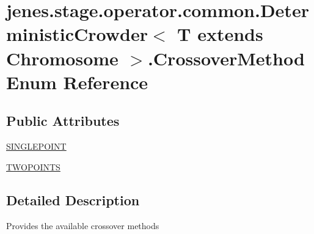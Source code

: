 \hypertarget{enumjenes_1_1stage_1_1operator_1_1common_1_1_deterministic_crowder_3_01_t_01extends_01_chromosome_01_4_1_1_crossover_method}{\section{jenes.\-stage.\-operator.\-common.\-Deterministic\-Crowder$<$ T extends Chromosome $>$.Crossover\-Method Enum Reference}
\label{enumjenes_1_1stage_1_1operator_1_1common_1_1_deterministic_crowder_3_01_t_01extends_01_chromosome_01_4_1_1_crossover_method}
}
\subsection*{Public Attributes}
\begin{DoxyCompactItemize}
\item 
\hyperlink{enumjenes_1_1stage_1_1operator_1_1common_1_1_deterministic_crowder_3_01_t_01extends_01_chromosome_01_4_1_1_crossover_method_a074512cc7f136f107813809e5422d0d5}{S\-I\-N\-G\-L\-E\-P\-O\-I\-N\-T}
\item 
\hyperlink{enumjenes_1_1stage_1_1operator_1_1common_1_1_deterministic_crowder_3_01_t_01extends_01_chromosome_01_4_1_1_crossover_method_a02e257679ab0444443a2618105f78793}{T\-W\-O\-P\-O\-I\-N\-T\-S}
\end{DoxyCompactItemize}


\subsection{Detailed Description}
Provides the available crossover methods 


